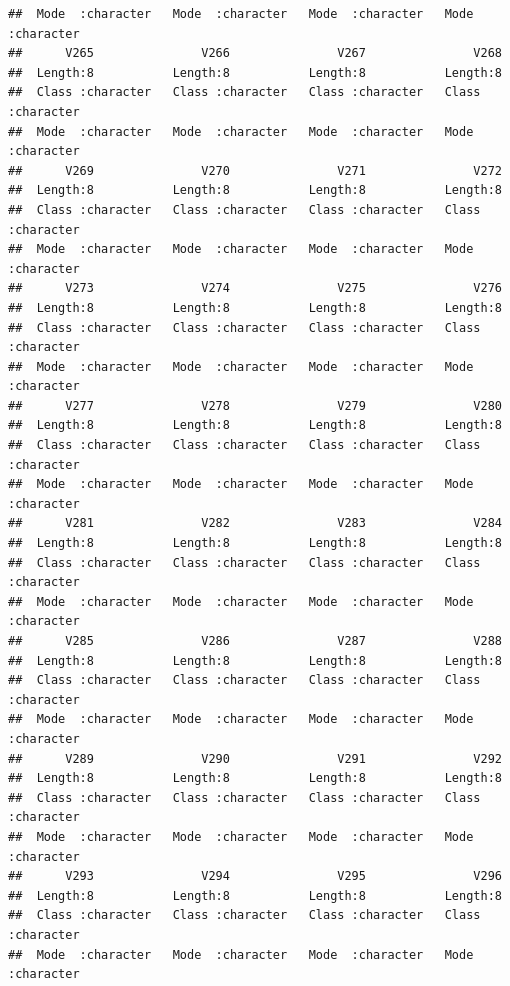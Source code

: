 \documentclass[
]{article}
\begin{document}
\begin{verbatim}
##  Mode  :character   Mode  :character   Mode  :character   Mode  :character  
##      V265               V266               V267               V268          
##  Length:8           Length:8           Length:8           Length:8          
##  Class :character   Class :character   Class :character   Class :character  
##  Mode  :character   Mode  :character   Mode  :character   Mode  :character  
##      V269               V270               V271               V272          
##  Length:8           Length:8           Length:8           Length:8          
##  Class :character   Class :character   Class :character   Class :character  
##  Mode  :character   Mode  :character   Mode  :character   Mode  :character  
##      V273               V274               V275               V276          
##  Length:8           Length:8           Length:8           Length:8          
##  Class :character   Class :character   Class :character   Class :character  
##  Mode  :character   Mode  :character   Mode  :character   Mode  :character  
##      V277               V278               V279               V280          
##  Length:8           Length:8           Length:8           Length:8          
##  Class :character   Class :character   Class :character   Class :character  
##  Mode  :character   Mode  :character   Mode  :character   Mode  :character  
##      V281               V282               V283               V284          
##  Length:8           Length:8           Length:8           Length:8          
##  Class :character   Class :character   Class :character   Class :character  
##  Mode  :character   Mode  :character   Mode  :character   Mode  :character  
##      V285               V286               V287               V288          
##  Length:8           Length:8           Length:8           Length:8          
##  Class :character   Class :character   Class :character   Class :character  
##  Mode  :character   Mode  :character   Mode  :character   Mode  :character  
##      V289               V290               V291               V292          
##  Length:8           Length:8           Length:8           Length:8          
##  Class :character   Class :character   Class :character   Class :character  
##  Mode  :character   Mode  :character   Mode  :character   Mode  :character  
##      V293               V294               V295               V296          
##  Length:8           Length:8           Length:8           Length:8          
##  Class :character   Class :character   Class :character   Class :character  
##  Mode  :character   Mode  :character   Mode  :character   Mode  :character  

\end{verbatim}
\end{document}
